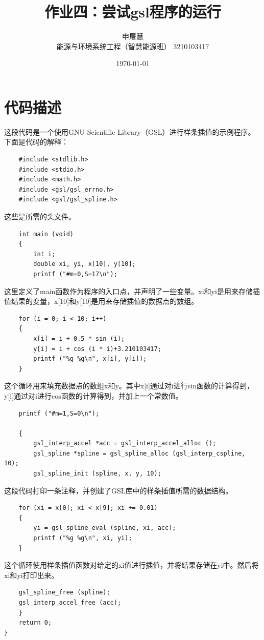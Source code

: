 \documentclass{ctexart}
\title{作业四：尝试gsl程序的运行}
\author{申屠慧 \\ 能源与环境系统工程（智慧能源班） 3210103417}
\date{\today}
\begin{document}
\maketitle
\section{代码描述}
这段代码是一个使用GNU Scientific Library（GSL）进行样条插值的示例程序。
下面是代码的解释：
\begin{lstlisting}
    #include <stdlib.h>
    #include <stdio.h>
    #include <math.h>
    #include <gsl/gsl_errno.h>
    #include <gsl/gsl_spline.h>
\end{lstlisting}

这些是所需的头文件。
\begin{lstlisting}
    int main (void)
    {
        int i;
        double xi, yi, x[10], y[10];
        printf ("#m=0,S=17\n");
\end{lstlisting}

这里定义了main函数作为程序的入口点，并声明了一些变量。xi和yi是用来存储插值结果的变量，x[10]和y[10]是用来存储插值的数据点的数组。
\begin{lstlisting}
    for (i = 0; i < 10; i++)
    {
        x[i] = i + 0.5 * sin (i);
        y[i] = i + cos (i * i)+3.210103417;
        printf ("%g %g\n", x[i], y[i]);
    }
\end{lstlisting}

这个循环用来填充数据点的数组x和y。其中x[i]通过对i进行sin函数的计算得到，y[i]通过对i进行cos函数的计算得到，并加上一个常数值。

\begin{lstlisting}
    printf ("#m=1,S=0\n");

    {
        gsl_interp_accel *acc = gsl_interp_accel_alloc ();
        gsl_spline *spline = gsl_spline_alloc (gsl_interp_cspline, 10);
        gsl_spline_init (spline, x, y, 10);

\end{lstlisting}

这段代码打印一条注释，并创建了GSL库中的样条插值所需的数据结构。
\begin{lstlisting}
    for (xi = x[0]; xi < x[9]; xi += 0.01)
    {
        yi = gsl_spline_eval (spline, xi, acc);
        printf ("%g %g\n", xi, yi);
    }
\end{lstlisting}

这个循环使用样条插值函数对给定的xi值进行插值，并将结果存储在yi中。然后将xi和yi打印出来。
\begin{lstlisting}
    gsl_spline_free (spline);
    gsl_interp_accel_free (acc);
    }
    return 0;
}
\end{lstlisting}
\end{document}
